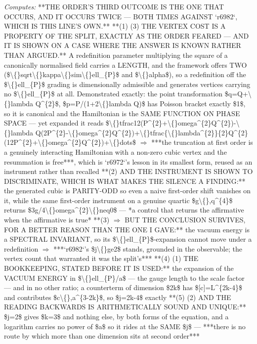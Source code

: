 \begin{description}
\emph{Computes:} **THE ORDER'S THIRD OUTCOME IS THE ONE THAT OCCURS, AND IT OCCURS TWICE --- BOTH TIMES AGAINST `r6982`, WHICH IS THIS LINE'S OWN.**  **(1) (3) THE VERTEX COST IS A PROPERTY OF THE SPLIT, EXACTLY AS THE ORDER FEARED --- AND IT IS SHOWN ON A CASE WHERE THE ANSWER IS KNOWN RATHER THAN ARGUED.** A redefinition parameter multiplying the square of a canonically normalised field carries a LENGTH, and the framework offers TWO (\$\textbackslash\{\}sqrt\textbackslash\{\}kappa\textbackslash\{\}sim\textbackslash\{\}ell\_\{P\}\$ and \$\textbackslash\{\}alpha\$), so a redefinition off the \$\textbackslash\{\}ell\_\{P\}\$ grading is dimensionally admissible and generates vertices carrying no \$\textbackslash\{\}ell\_\{P\}\$ at all. Demonstrated exactly: the point transformation \$q=Q+\textbackslash\{\}lambda Q\textasciicircum{}\{2\}\$, \$p=P/(1+2\textbackslash\{\}lambda Q)\$ has Poisson bracket exactly \$1\$, so it is canonical and the Hamiltonian is the SAME FUNCTION ON PHASE SPACE --- yet expanded it reads \$\textbackslash\{\}tfrac12(P\textasciicircum{}\{2\}+\textbackslash\{\}omega\textasciicircum{}\{2\}Q\textasciicircum{}\{2\})-\textbackslash\{\}lambda Q(2P\textasciicircum{}\{2\}-\textbackslash\{\}omega\textasciicircum{}\{2\}Q\textasciicircum{}\{2\})+\textbackslash\{\}tfrac\{\textbackslash\{\}lambda\textasciicircum{}\{2\}\}\{2\}Q\textasciicircum{}\{2\} (12P\textasciicircum{}\{2\}+\textbackslash\{\}omega\textasciicircum{}\{2\}Q\textasciicircum{}\{2\})+\textbackslash\{\}dots\$ \ensuremath{\Rightarrow} ***the truncation at first order is a genuinely interacting Hamiltonian with a non-zero cubic vertex and the resummation is free***, which is `r6972`'s lesson in its smallest form, reused as an instrument rather than recalled  **(2) AND THE INSTRUMENT IS SHOWN TO DISCRIMINATE, WHICH IS WHAT MAKES THE SILENCE A FINDING:** the generated cubic is PARITY-ODD so even a naive first-order shift vanishes on it, while the same first-order instrument on a genuine quartic \$g\textbackslash\{\},q\textasciicircum{}\{4\}\$ returns \$3g/4\textbackslash\{\}omega\textasciicircum{}\{2\}\textbackslash\{\}neq0\$ --- *a control that returns the affirmative when the affirmative is true*  **(3) \ensuremath{\Rightarrow} BUT THE CONCLUSION SURVIVES, FOR A BETTER REASON THAN THE ONE I GAVE:** the vacuum energy is a SPECTRAL INVARIANT, so its \$\textbackslash\{\}ell\_\{P\}\$-expansion cannot move under a redefinition \ensuremath{\Rightarrow} ***`r6982`'s \$j\textbackslash\{\}ge2\$ stands, grounded in the observable; the vertex count that warranted it was the split's***  **(4) (1) THE BOOKKEEPING, STATED BEFORE IT IS USED:** the expansion of the VACUUM ENERGY in \$\textbackslash\{\}ell\_\{P\}/a\$ --- the gauge length to the scale factor --- and in no other ratio; a counterterm of dimension \$2k\$ has \$[c]=L\textasciicircum{}\{2k-4\}\$ and contributes \$c\textbackslash\{\},a\textasciicircum{}\{3-2k\}\$, so \$j=2k-4\$ exactly  **(5) (2) AND THE READING BACKWARDS IS ARITHMETICALLY SOUND AND UNIQUE:** \$j=2\$ gives \$k=3\$ and nothing else, by both forms of the equation, and a logarithm carries no power of \$a\$ so it rides at the SAME \$j\$ --- ***there is no route by which more than one dimension sits at second order***

\end{description}
